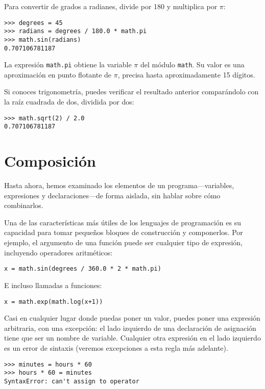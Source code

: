 Para convertir de grados a radianes, divide por 180 y multiplica por $\pi$:

\begin{lstlisting}
>>> degrees = 45
>>> radians = degrees / 180.0 * math.pi
>>> math.sin(radians)
0.707106781187
\end{lstlisting}

La expresión \texttt{math.pi} obtiene la variable $\pi$ del módulo \texttt{math}. Su valor es una aproximación en punto flotante de $\pi$, precisa hasta aproximadamente 15 dígitos.

Si conoces trigonometría, puedes verificar el resultado anterior comparándolo con la raíz cuadrada de dos, dividida por dos:

\begin{lstlisting}
>>> math.sqrt(2) / 2.0
0.707106781187
\end{lstlisting}

\section{Composición}

Hasta ahora, hemos examinado los elementos de un programa—variables, expresiones y declaraciones—de forma aislada, sin hablar sobre cómo combinarlos.

Una de las características más útiles de los lenguajes de programación es su capacidad para tomar pequeños bloques de construcción y componerlos. Por ejemplo, el argumento de una función puede ser cualquier tipo de expresión, incluyendo operadores aritméticos:

\begin{lstlisting}
x = math.sin(degrees / 360.0 * 2 * math.pi)
\end{lstlisting}

E incluso llamadas a funciones:

\begin{lstlisting}
x = math.exp(math.log(x+1))
\end{lstlisting}

Casi en cualquier lugar donde puedas poner un valor, puedes poner una expresión arbitraria, con una excepción: el lado izquierdo de una declaración de asignación tiene que ser un nombre de variable. Cualquier otra expresión en el lado izquierdo es un error de sintaxis (veremos excepciones a esta regla más adelante).

\begin{lstlisting}
>>> minutes = hours * 60
>>> hours * 60 = minutes
SyntaxError: can't assign to operator
\end{lstlisting}

